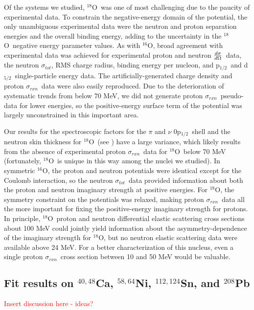 \documentclass[twocolumn,secnumarabic,amssymb, nobibnotes, aps, prl,
superscriptaddress, nobalancelastpage]{revtex4}
\newcommand{\tot}{\ensuremath{\sigma_{tot}}}
\newcommand{\rxn}{\ensuremath{\sigma_{rxn}}}
\newcommand{\el}{\ensuremath{\frac{\lowercase{d}\sigma}{\lowercase{d}\Omega}}}
\newcommand{\oSix}{\ensuremath{^{16}}O}
\newcommand{\oEight}{\ensuremath{^{18}}O}
\newcommand{\caAughtEight}{\ensuremath{^{40,48}}C\lowercase{a}}
\newcommand{\niEightFour}{\ensuremath{^{58,64}}N\lowercase{i}}
\newcommand{\snTwelveFour}{\ensuremath{^{112,124}}S\lowercase{n}}
\newcommand{\pbEight}{\ensuremath{^{208}}P\lowercase{b}}
\newcommand{\pOne}{p\ensuremath{_{1/2}}}
\newcommand{\dFive}{d\ensuremath{_{5/2}}}
\begin{document}
Of the systems we studied, \oEight\ was one of most challenging due to the 
paucity of experimental data. To constrain the negative-energy domain
of the potential, the only unambiguous experimental data were the neutron
and proton separation energies and the overall binding energy, adding
to the uncertainty in the \oEight\ negative energy parameter values.
As with \oSix, broad agreement with experimental data was achieved for
experimental proton and neutron \el\ data, the neutron \tot, RMS charge radius,
binding energy per nucleon, and \pOne\ and \dFive\ single-particle energy data.
The artificially-generated charge density and proton \rxn\ data were also
easily reproduced. Due to the deterioration of systematic trends from
\cite{Carlson1975} below 70 MeV, we did not generate proton \rxn\ pseudo-data
for lower energies, so the positive-energy surface term of the potential
was largely unconstrained in this important area.

Our results for the spectroscopic factors for the $\pi$ and $\nu$ 0\pOne\ shell and the
neutron skin thickness for \oEight\ (see \cite{Pruitt2020PRL}) have a large variance,
which likely results from the absence of experimental proton \rxn\ data for
\oEight\ below 70 MeV (fortunately, \oEight\ is unique in this way among the
nuclei we studied). 
In symmetric \oSix, the proton and neutron potentials were identical except for
the Coulomb interaction, so the neutron \tot\ data provided information about
both the proton and neutron imaginary strength at positive energies. For
\oEight, the symmetry constraint on the potentials was relaxed, making proton
\rxn\ data all the more important for fixing the positive-energy imaginary
strength for protons. In principle, \oEight\ proton and neutron
differential elastic scattering cross sections about 100 MeV could jointly
yield information about the asymmetry-dependence of the imaginary strength for
\oEight, but no neutron elastic scattering data were available above 24 MeV. For
a better characterization of this nucleus, even a single proton \rxn\ cross
section between 10 and 50 MeV would be valuable.

\subsection{Fit results on \caAughtEight, \niEightFour, \snTwelveFour, and \pbEight}
\textcolor{red}{Insert discussion here - ideas?}
\end{document}

